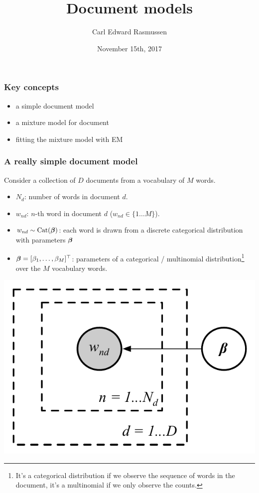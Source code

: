

\title{Document models}
\author{Carl Edward Rasmussen}
\date{November 15th, 2017}




\begin{frame}
\titlepage
\end{frame}

\begin{frame}
\frametitle{Key concepts}

\begin{itemize}
\item a simple document model
\item a mixture model for document
\item fitting the mixture model with EM
\end{itemize}
\end{frame}


\begin{frame}
\frametitle{A really simple document model}

Consider a collection of $D$ documents from a vocabulary of $M$  words.

\parbox{0.7\linewidth}{
\begin{itemize}
\item $N_d$: number of words in document $d$.
\item $w_{nd}$: $n$-th word in document $d$ ($w_{nd}\in\{1 \ldots M\}$).
\item $w_{nd} \sim \rm{Cat}(\boldsymbol{\beta})$: each word is drawn from a
  discrete categorical distribution with parameters $\boldsymbol{\beta}$
\item $\boldsymbol{\beta}=[\beta_1,\ldots,\beta_M]^\top$: parameters of a
  categorical / multinomial distribution\footnote{It's a categorical
    distribution if we observe the sequence of words in the document,
    it's a multinomial if we only observe the counts.} over the $M$ vocabulary words.
\end{itemize}
}
%
\parbox{0.29\linewidth}{
\hfill
\includegraphics[width=\linewidth]{categorical_model}
}

\end{frame}



